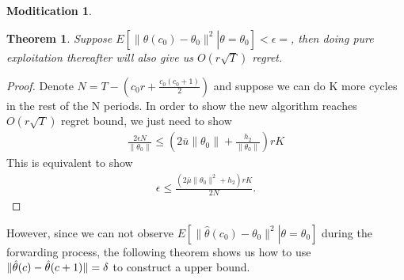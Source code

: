 \documentclass{article}
\newtheorem{theorem}{Theorem}
\theoremstyle{plain}
\theoremstyle{definition}
\newtheorem{modification}{Moditication}
\begin{document}
\begin{modification}
\begin{theorem}
Suppose $E\left[\left.\|\hat{\theta}(c_{0})-\theta_0\|^2 \right |\theta = \theta_0\right]<\epsilon=$, then doing pure exploitation thereafter will also give us $O(r\sqrt{T})$ regret.
\end{theorem}
\begin{proof}
Denote $N = T-(c_{0}r+\frac{c_{0}(c_{0}+1)}{2})$ and suppose we can do K more cycles in the rest of the N periods. In order to show the new algorithm reaches $O(r\sqrt{T})$ regret bound, we just need to show
\begin{align}
\frac{2\epsilon N}{\|\theta_{0}\|}\leq (2\bar{u}\|\theta_0\|+\frac{h_2}{\|\theta_0\|})rK \nonumber 
\end{align}
This is equivalent to show
\begin{align}
\epsilon\leq \frac{(2\bar{\mu}\|\theta_{0}\|^{2}+h_{2})rK}{2N}. \nonumber 
\end{align}

\end{proof}

However, since we can not observe $E\left[\left.\|\hat{\theta}(c_{0})-\theta_0\|^2 \right |\theta = \theta_0\right]$ during the forwarding process, the following theorem shows us how to use $\|\hat{\theta}(c)-\hat{\theta}(c+1)\|=\bold{\delta}$ to construct a upper bound.


\end{modification}
\end{document}
